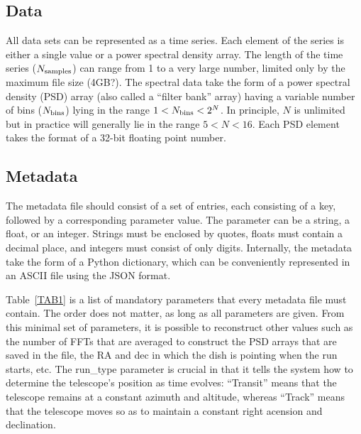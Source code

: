 \documentclass[12pt]{article}
\begin{document}
 \subsection{Data}
All data sets can be represented as a time series.  Each element of the series is either a single value or a power spectral density array.     The length of the time series ($N_{\rm samples}$) can range from 1 to a very large number, limited only by the maximum file size (4GB?).   The spectral data take the form of a power spectral density (PSD) array (also called a ``filter bank'' array) having a variable number of bins ($N_{\rm bins}$) lying in the range $ 1 < N_{\rm bins} < 2^N$.   In principle, $N$ is unlimited but in practice will generally lie in the range $5 < N < 16$. 
Each PSD element takes the format of a 32-bit floating point number.  


 
 \subsection{Metadata}
 
 The metadata file should consist of a set of entries, each consisting of a key, followed by a corresponding parameter value.   The parameter can be a string, a float, or an integer.    Strings must be enclosed by quotes, floats must contain a decimal place, and integers must consist of only digits.   Internally, the metadata take the form of a Python dictionary, which can be conveniently represented in an ASCII file using the JSON format. 

 Table~\ref{TAB1} is a list of mandatory parameters that every metadata file must contain.   The 
 order does not matter, as long as all parameters are given.   From this minimal set of parameters, 
 it is possible to reconstruct other values such as the number of FFTs that are averaged to construct 
 the PSD arrays that are saved in the file, the RA and dec in which the dish is pointing when the run starts, etc. The run\_type parameter is crucial in that it tells the system how to determine the telescope's position as time evolves: ``Transit'' means that the telescope remains at a constant azimuth and altitude, whereas ``Track'' means that the telescope moves so as to maintain a constant right acension and declination.     
 
\end{document}

